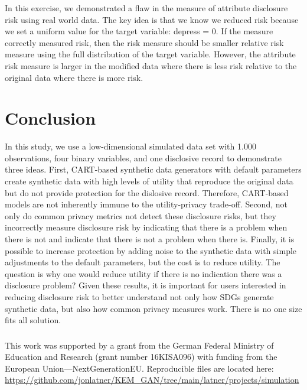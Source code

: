 \documentclass[runningheads]{llncs}
\begin{document}
In this exercise, we demonstrated a flaw in the measure of attribute disclosure risk using real world data.  The key idea is that we know we reduced risk because we set a uniform value for the target variable: depress = 0.  If the measure correctly measured risk, then the risk measure should be smaller relative risk measure using the full distribution of the target variable.  However, the attribute risk measure is larger in the modified data where there is less risk relative to the original data where there is more risk.  


\section{Conclusion}

In this study, we use a low-dimensional simulated data set with 1.000 observations, four binary variables, and one disclosive record to demonstrate three ideas.  First, CART-based synthetic data generators with default parameters create synthetic data with high levels of utility that reproduce the original data but do not provide protection for the dislosive record.  Therefore, CART-based models are not inherently immune to the utility-privacy trade-off.  Second, not only do common privacy metrics not detect these disclosure risks, but they incorrectly measure disclosure risk by indicating that there is a problem when there is not and indicate that there is not a problem when there is.  Finally, it is possible to increase protection by adding noise to the synthetic data with simple adjustments to the default parameters, but the cost is to reduce utility.  The question is why one would reduce utility if there is no indication there was a disclosure problem?  Given these results, it is important for users interested in reducing disclosure risk to better understand not only how SDGs generate synthetic data, but also how common privacy measures work.  There is no one size fits all solution. 

\subsubsection{\ackname} This work was supported by a grant from the German Federal Ministry of Education and Research (grant number 16KISA096) with funding from the European Union—NextGenerationEU.  Reproducible files are located here: \url{https://github.com/jonlatner/KEM\_GAN/tree/main/latner/projects/simulation}
\end{document}
